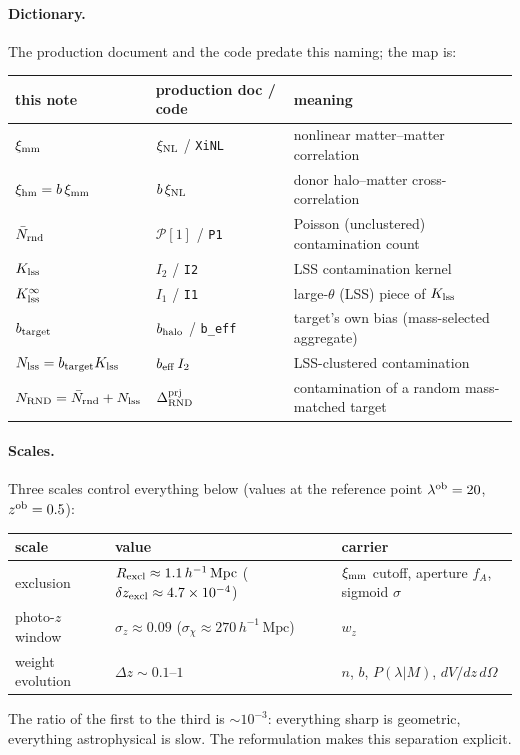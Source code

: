 \documentclass[a4paper, 11pt]{article}
\newcommand{\lob}{\lambda^{\rm ob}}
\newcommand{\zob}{z^{\rm ob}}
\newcommand{\dprj}{\Delta^{\rm prj}}
\newcommand{\ximm}{\xi_{\rm mm}}
\newcommand{\xihm}{\xi_{\rm hm}}
\newcommand{\hMpc}{h^{-1}\,\mathrm{Mpc}}
\newcommand{\Pop}{\mathcal{P}}
\newcommand{\Rex}{R_{\rm excl}}
\newcommand{\btar}{b_{\rm target}}
\newcommand{\Nbar}{\bar{N}_{\rm rnd}}
\newcommand{\Klss}{K_{\rm lss}}
\newcommand{\KlssInf}{K_{\rm lss}^{\infty}}
\newcommand{\Nlss}{N_{\rm lss}}
\newcommand{\Nrnd}{N_{\rm RND}}
\begin{document}
\paragraph{Dictionary.} The production document and the code
predate this naming; the map is:
\begin{center}
\small
\begin{tabular}{l l l}
\toprule
this note & production doc / code & meaning \\
\midrule
$\ximm$ & $\xi_{\rm NL}$ / \texttt{XiNL} & nonlinear matter--matter correlation \\
$\xihm = b\,\ximm$ & $b\,\xi_{\rm NL}$ & donor halo--matter cross-correlation \\
$\Nbar$ & $\Pop[1]$ / \texttt{P1} & Poisson (unclustered) contamination count \\
$\Klss$ & $I_2$ / \texttt{I2} & LSS contamination kernel \\
$\KlssInf$ & $I_1$ / \texttt{I1} & large-$\theta$ (LSS) piece of $\Klss$ \\
$\btar$ & $b_{\rm halo}$ / \texttt{b\_eff} & target's own bias (mass-selected aggregate) \\
$\Nlss = \btar\Klss$ & $b_{\rm eff}\,I_2$ & LSS-clustered contamination \\
$\Nrnd = \Nbar+\Nlss$ & $\dprj_{\rm RND}$ & contamination of a random mass-matched target \\
\bottomrule
\end{tabular}
\end{center}

\paragraph{Scales.} Three scales control everything below (values
at the reference point $\lob=20$, $\zob=0.5$):
\begin{center}
\small
\begin{tabular}{l l l}
\toprule
scale & value & carrier \\
\midrule
exclusion & $\Rex \approx 1.1\,\hMpc$
  \;($\delta z_{\rm excl}\approx 4.7\times10^{-4}$)
  & $\ximm$ cutoff, aperture $f_A$, sigmoid $\sigma$ \\
photo-$z$ window & $\sigma_z \approx 0.09$
  \;($\sigma_\chi \approx 270\,\hMpc$) & $w_z$ \\
weight evolution & $\Delta z \sim 0.1$--$1$
  & $n$, $b$, $P(\lambda|M)$, $dV/dz\,d\Omega$ \\
\bottomrule
\end{tabular}
\end{center}
The ratio of the first to the third is $\sim 10^{-3}$: everything
sharp is geometric, everything astrophysical is slow. The
reformulation makes this separation explicit.
\end{document}
